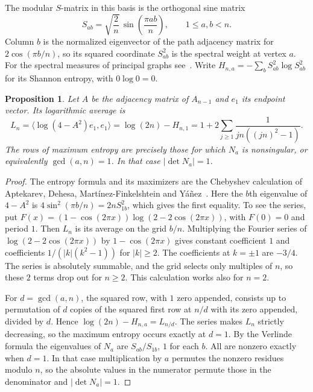 \documentclass[11pt,a4paper]{article}
\newtheorem{prop}[thm]{Proposition}
\begin{document}
The modular $S$-matrix in this basis is the orthogonal sine matrix
\[
 S_{ab}=\sqrt{\frac2n}\,\sin\left(\frac{\pi ab}{n}\right),\qquad 1\leq a,b<n.
\]
Column $b$ is the normalized eigenvector of the path adjacency matrix for $2\cos(\pi b/n)$, so its squared coordinate $S_{ab}^2$ is the spectral weight at vertex $a$. For the spectral measures of principal graphs see~\cite{bb}. Write $H_{n,a}=-\sum_b S_{ab}^2\log S_{ab}^2$ for its Shannon entropy, with $0\log0=0$.

\begin{samepage}
\begin{prop}\label{path-entropy}
Let $A$ be the adjacency matrix of $A_{n-1}$ and $e_1$ its endpoint vector. Its logarithmic average is
\[
 L_n=\langle\log(4-A^2)e_1,e_1\rangle
 =\log(2n)-H_{n,1}
 =1+2\sum_{j\geq1}\frac{1}{jn((jn)^2-1)}.
\]
The rows of maximum entropy are precisely those for which $N_a$ is nonsingular, or equivalently $\gcd(a,n)=1$. In that case $|\det N_a|=1$.
\end{prop}
\end{samepage}
\begin{proof}
The entropy formula and its maximizers are the Chebyshev calculation of Aptekarev, Dehesa, Mart\'inez-Finkelshtein and Y\'a\~nez~\cite{entropy}. Here the $b$th eigenvalue of $4-A^2$ is $4\sin^2(\pi b/n)=2nS_{1b}^2$, which gives the first equality. To see the series, put $F(x)=(1-\cos(2\pi x))\log(2-2\cos(2\pi x))$, with $F(0)=0$ and period $1$. Then $L_n$ is its average on the grid $b/n$. Multiplying the Fourier series of $\log(2-2\cos(2\pi x))$ by $1-\cos(2\pi x)$ gives constant coefficient $1$ and coefficients $1/(|k|(k^2-1))$ for $|k|\geq2$. The coefficients at $k=\pm1$ are $-3/4$. The series is absolutely summable, and the grid selects only multiples of $n$, so these $2$ terms drop out for $n\geq2$. This calculation works also for $n=2$.

For $d=\gcd(a,n)$, the squared row, with $1$ zero appended, consists up to permutation of $d$ copies of the squared first row at $n/d$ with its zero appended, divided by $d$. Hence $\log(2n)-H_{n,a}=L_{n/d}$. The series makes $L_n$ strictly decreasing, so the maximum entropy occurs exactly at $d=1$. By the Verlinde formula the eigenvalues of $N_a$ are $S_{ab}/S_{1b}$, $1$ for each $b$. All are nonzero exactly when $d=1$. In that case multiplication by $a$ permutes the nonzero residues modulo $n$, so the absolute values in the numerator permute those in the denominator and $|\det N_a|=1$.
\end{proof}
\end{document}
